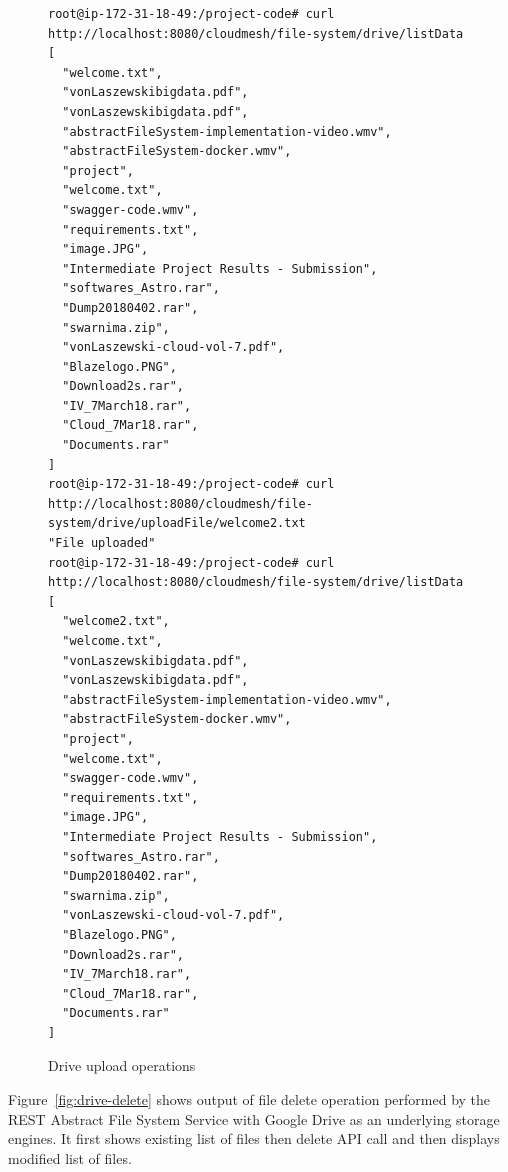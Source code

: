 \begin{figure}[!ht]
\begin{footnotesize}
\begin{verbatim}
root@ip-172-31-18-49:/project-code# curl 
http://localhost:8080/cloudmesh/file-system/drive/listData
[
  "welcome.txt",
  "vonLaszewskibigdata.pdf",
  "vonLaszewskibigdata.pdf",
  "abstractFileSystem-implementation-video.wmv",
  "abstractFileSystem-docker.wmv",
  "project",
  "welcome.txt",
  "swagger-code.wmv",
  "requirements.txt",
  "image.JPG",
  "Intermediate Project Results - Submission",
  "softwares_Astro.rar",
  "Dump20180402.rar",
  "swarnima.zip",
  "vonLaszewski-cloud-vol-7.pdf",
  "Blazelogo.PNG",
  "Download2s.rar",
  "IV_7March18.rar",
  "Cloud_7Mar18.rar",
  "Documents.rar"
]
root@ip-172-31-18-49:/project-code# curl 
http://localhost:8080/cloudmesh/file-system/drive/uploadFile/welcome2.txt
"File uploaded"
root@ip-172-31-18-49:/project-code# curl 
http://localhost:8080/cloudmesh/file-system/drive/listData
[
  "welcome2.txt",
  "welcome.txt",
  "vonLaszewskibigdata.pdf",
  "vonLaszewskibigdata.pdf",
  "abstractFileSystem-implementation-video.wmv",
  "abstractFileSystem-docker.wmv",
  "project",
  "welcome.txt",
  "swagger-code.wmv",
  "requirements.txt",
  "image.JPG",
  "Intermediate Project Results - Submission",
  "softwares_Astro.rar",
  "Dump20180402.rar",
  "swarnima.zip",
  "vonLaszewski-cloud-vol-7.pdf",
  "Blazelogo.PNG",
  "Download2s.rar",
  "IV_7March18.rar",
  "Cloud_7Mar18.rar",
  "Documents.rar"
]
\end{verbatim}
\end{footnotesize}
\caption{Drive upload operations}\label{fig:drive-upload}
\end{figure}


Figure~\ref{fig:drive-delete} shows output of file delete operation
performed by the REST Abstract File System Service with Google Drive
as an underlying storage engines.
It first shows existing list of files then delete API call and then 
displays modified list of files.

